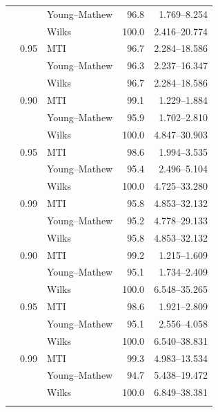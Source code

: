 \begin{longtable}{@{}rrlrr@{}}
 &  & Young--Mathew & 96.8 & 1.769--8.254 \\
 &  & Wilks & 100.0 & 2.416--20.774 \\
\addlinespace[0.25em]
100 & 0.95 & MTI & 96.7 & 2.284--18.586 \\
 &  & Young--Mathew & 96.3 & 2.237--16.347 \\
 &  & Wilks & 96.7 & 2.284--18.586 \\
\addlinespace[0.25em]
500 & 0.90 & MTI & 99.1 & 1.229--1.884 \\
 &  & Young--Mathew & 95.9 & 1.702--2.810 \\
 &  & Wilks & 100.0 & 4.847--30.903 \\
\addlinespace[0.25em]
500 & 0.95 & MTI & 98.6 & 1.994--3.535 \\
 &  & Young--Mathew & 95.4 & 2.496--5.104 \\
 &  & Wilks & 100.0 & 4.725--33.280 \\
\addlinespace[0.25em]
500 & 0.99 & MTI & 95.8 & 4.853--32.132 \\
 &  & Young--Mathew & 95.2 & 4.778--29.133 \\
 &  & Wilks & 95.8 & 4.853--32.132 \\
\addlinespace[0.25em]
1000 & 0.90 & MTI & 99.2 & 1.215--1.609 \\
 &  & Young--Mathew & 95.1 & 1.734--2.409 \\
 &  & Wilks & 100.0 & 6.548--35.265 \\
\addlinespace[0.25em]
1000 & 0.95 & MTI & 98.6 & 1.921--2.809 \\
 &  & Young--Mathew & 95.1 & 2.556--4.058 \\
 &  & Wilks & 100.0 & 6.540--38.831 \\
\addlinespace[0.25em]
1000 & 0.99 & MTI & 99.3 & 4.983--13.534 \\
 &  & Young--Mathew & 94.7 & 5.438--19.472 \\
 &  & Wilks & 100.0 & 6.849--38.381 \\
\addlinespace[0.25em]
\bottomrule
\end{longtable}
\endgroup
